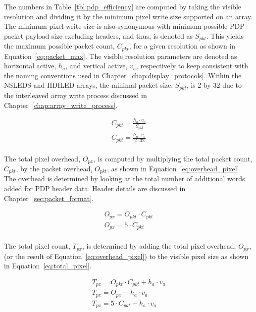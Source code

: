     The numbers in Table~\ref{tbl:pdp_efficiency} are computed by taking the visible resolution and dividing it by the minimum pixel write size supported on an array. The minimum pixel write size is also synonymous with minimum possible PDP packet payload size excluding headers, and thus, is denoted as $S_{pkt}$. This yields the maximum possible packet count, $C_{pkt}$, for a given resolution as shown in Equation~\eqref{eq:packet_max}. The visible resolution parameters are denoted as horizontal active, $h_a$, and vertical active, $v_a$, respectively to keep consistent with the naming conventions used in Chapter~\ref{chap:display_protocols}. Within the NSLEDS and HDILED arrays, the minimal packet size, $S_{pkt}$, is 2 by 32 due to the interleaved array write process discussed in Chapter~\ref{chap:array_write_process}.

    \begin{equation}
        \begin{array}{ l }
            \displaystyle C_{pkt}=\frac{h_a \cdot v_a}{S_{pkt}} \\[13pt]
            \displaystyle C_{pkt}=\frac{h_a \cdot v_a}{2 \cdot 32}\\[13pt]
        \end{array}
        \label{eq:packet_max}
    \end{equation}

    The total pixel overhead, $O_{px}$, is computed by multiplying the total packet count, $C_{pkt}$, by the packet overhead, $O_{pkt}$, as shown in Equation~\eqref{eq:overhead_pixel}. The overhead is determined by looking at the total number of additional words added for PDP header data. Header details are discussed in Chapter~\ref{sec:packet_format}.

    \begin{equation}
        \begin{array}{ l }
            \displaystyle O_{px}=O_{pkt} \cdot C_{pkt} \\
            \displaystyle O_{px}=5\cdot C_{pkt} \\[13pt]
        \end{array}
        \label{eq:overhead_pixel}
    \end{equation}

    The total pixel count, $T_{px}$, is determined by adding the total pixel overhead, $O_{px}$, (or the result of Equation~\eqref{eq:overhead_pixel}) to the visible pixel size as shown in Equation~\eqref{eq:total_pixel}.

    \begin{equation}
        \begin{array}{ l }
            \displaystyle T_{px}=O_{pkt} \cdot C_{pkt} + h_a \cdot v_a \\
            \displaystyle T_{px}=O_{px} + h_a \cdot v_a \\
            \displaystyle T_{px}=5\cdot C_{pkt} + h_a \cdot v_a \\[13pt]
        \end{array}
        \label{eq:total_pixel}
    \end{equation}

